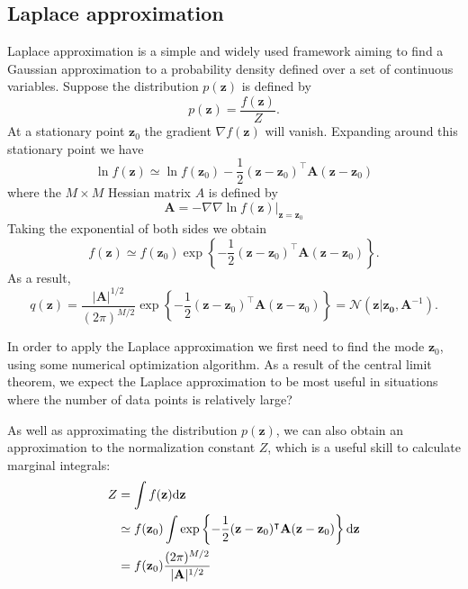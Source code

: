 \documentclass[a4paper]{book}
\newcommand{\ud}{\mathrm{d}}
\renewcommand{\bf}{\mathbf}
\renewcommand{\cal}{\mathcal}
\begin{document}
\subsection{Laplace approximation}
Laplace approximation is a simple and widely used framework aiming to find a Gaussian approximation to a probability density defined over a set of continuous variables. Suppose the distribution $p(\bf{z})$ is defined by
\begin{equation}
	p(\bf{z}) = \frac{f(\bf{z})}{Z}.
\end{equation}
At a stationary point $\bf{z}_0$ the gradient $\nabla f(\bf{z})$ will vanish. Expanding around this stationary point we have
\begin{equation}
	\ln f(\bf{z}) \simeq \ln f(\bf{z}_0) - \frac{1}{2}(\bf{z-z}_0)^{\intercal} \bf{A}(\bf{z-z}_0)
\end{equation}
where the $M \times M$ Hessian matrix $A$ is defined by
\begin{equation}
	\bf{A} = -\nabla \nabla \ln f(\bf{z})|_{\bf{z=z}_0}
\end{equation}
Taking the exponential of both sides we obtain
\begin{equation}
	f(\bf{z}) \simeq f(\bf{z}_0) \exp \left\{ -\frac{1}{2} (\bf{z-z}_0)^{\intercal} \bf{A} (\bf{z-z}_0) \right\}.
\end{equation}
As a result,
\begin{equation}
	q(\bf{z}) = \frac{|\bf{A}|^{1/2}}{(2\pi)^{M/2}} \exp \left\{ -\frac{1}{2} (\bf{z-z}_0)^{\intercal} \bf{A} (\bf{z-z}_0) \right\} =\cal{N}(\bf{z|z_0},\bf{A}^{-1}).
\end{equation}

In order to apply the Laplace approximation we first need to find the mode $\bf{z}_0$, using some numerical optimization algorithm. As a result of the central limit theorem, we expect the Laplace approximation to be most useful in situations where the number of data points is relatively large?

As well as approximating the distribution $p(\bf{z})$, we can also obtain an approximation to the normalization constant $Z$, which is a useful skill to calculate marginal integrals:
\begin{align}
	Z &= \int f(\bf{z}) \ud \bf{z } \notag \\
	&\simeq f(\bf{z}_0) \int \exp \left\{ -\frac{1}{2} (\bf{z-z}_0)^{\intercal} \bf{A} (\bf{z-z}_0) \right\} \ud \bf{z} \notag\\
	&= f(\bf{z}_0) \frac{(2\pi)^{M/2}}{|\bf{A}|^{1/2}} \label{LapInt}
\end{align}
\end{document}
